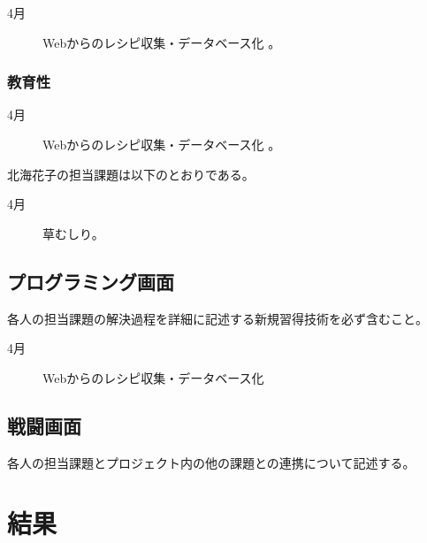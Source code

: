 \documentclass[openany,11pt,papersize]{jsbook}
\begin{document}
 
\begin{description}
 \item[4月] Webからのレシピ収集・データベース化 。

\end{description}

\subsection{教育性}
\begin{description}
 \item[4月] Webからのレシピ収集・データベース化 。

\end{description}


北海花子の担当課題は以下のとおりである。 
\begin{description}
 \item[4月] 草むしり。

 \end{description}


\section{プログラミング画面}
\begin{hissu}
各人の担当課題の解決過程を詳細に記述する新規習得技術を必ず含むこと。
\end{hissu}

\begin{description}
 \item[4月] Webからのレシピ収集・データベース化 

\end{description}



\section{戦闘画面}
\begin{hissu}
各人の担当課題とプロジェクト内の他の課題との連携について記述する。
\end{hissu}







\chapter{結果}
\end{document}
